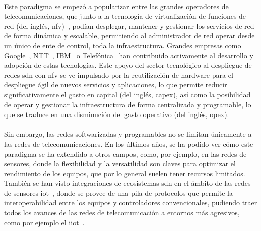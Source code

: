 \\
Este paradigma se empezó a popularizar entre las grandes operadores de telecomunicaciones, que junto a la tecnología de virtualización de funciones de red (del inglés, \gls{nfv})~\cite{etsi2012nfv}, podían desplegar, mantener y gestionar los servicios de red de forma dinámica y escalable, permitiendo al administrador de red operar desde un único de ente de control, toda la infraestructura. Grandes empresas como Google~\cite{vahdat2016purpose}, NTT~\cite{tomonori2013introduction}, IBM~\cite{racherla2014implementing} o Telefónica~\cite{montero2017extending} han contribuido activamente al desarrollo y adopción de estas tecnologías. Este apoyo del sector tecnológico al despliegue de redes \gls{sdn} con \gls{nfv} se ve impulsado por la reutilización de hardware para el despliegue ágil de nuevos servicios y aplicaciones, lo que permite reducir significativamente el gasto en capital (del inglés, \gls{capex}), así como la posibilidad de operar y gestionar la infraestructura de forma centralizada y programable, lo que se traduce en una disminución del gasto operativo (del inglés, \gls{opex}).\\
\\
Sin embargo, las redes softwarizadas y programables no se limitan únicamente a las redes de telecomunicaciones. En los últimos años, se ha podido ver cómo este paradigma se ha extendido a otros campos, como, por ejemplo, en las redes de sensores, donde la flexibilidad y la versatilidad son claves para optimizar el rendimiento de los equipos, que por lo general suelen tener recursos limitados. También se han visto integraciones de ecosistemas \gls{sdn} en el ámbito de las redes de sensores \gls{iot}~\cite{baddeley2018evolving}, donde se provee de una pila de protocolos que permite la interoperabilidad entre los equipos y controladores convencionales, pudiendo traer todos los avances de las redes de telecomunicación a entornos más agresivos, como por ejemplo el \gls{iiot}~\cite{carrascal2025softwarized}.\\
\\
